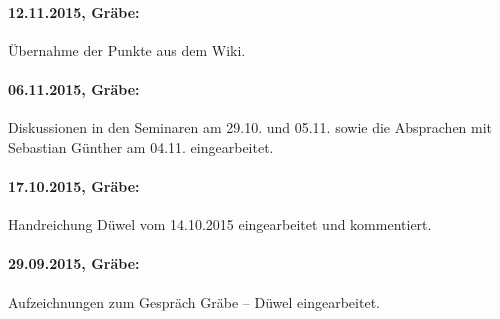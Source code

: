 \documentclass[a4paper,11pt]{article}
\begin{document}
\paragraph{12.11.2015, Gräbe:} 
Übernahme der Punkte aus dem Wiki. 

\paragraph{06.11.2015, Gräbe:} 
Diskussionen in den Seminaren am 29.10. und 05.11.  sowie die Absprachen mit
Sebastian Günther am 04.11. eingearbeitet.

\paragraph{17.10.2015, Gräbe:} 
Handreichung Düwel vom 14.10.2015 eingearbeitet und kommentiert.

\paragraph{29.09.2015, Gräbe:} 
Aufzeichnungen zum Gespräch Gräbe -- Düwel eingearbeitet. 
\end{document}
